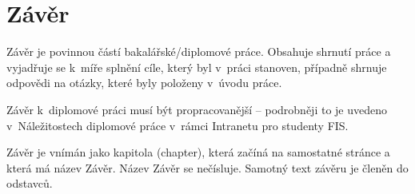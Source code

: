 \chapter*{Závěr}

Závěr je povinnou částí bakalářské/diplomové práce. Obsahuje shrnutí práce a vyjadřuje se k~míře splnění cíle, který byl v~práci stanoven, případně shrnuje odpovědi na otázky, které byly položeny v~úvodu práce. 

Závěr k~diplomové práci musí být propracovanější -- podrobněji to je uvedeno v~Náležitostech diplomové práce v~rámci Intranetu pro studenty FIS.

Závěr je vnímán jako kapitola (chapter), která začíná na samostatné stránce a která má název Závěr.  Název Závěr se nečísluje. Samotný text závěru je členěn do odstavců.